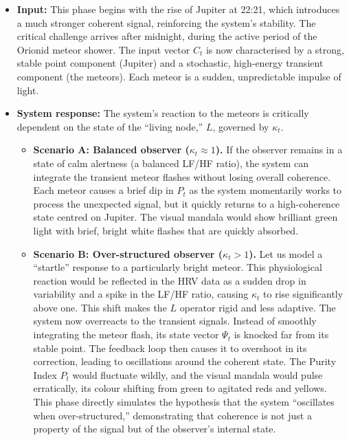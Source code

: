 \documentclass{article}
\begin{document}
\begin{itemize}
    \item \textbf{Input:} This phase begins with the rise of Jupiter at 22:21, which introduces a much stronger coherent signal, reinforcing the system's stability. The critical challenge arrives after midnight, during the active period of the Orionid meteor shower. The input vector $C_t$ is now characterised by a strong, stable point component (Jupiter) and a stochastic, high-energy transient component (the meteors). Each meteor is a sudden, unpredictable impulse of light.
    \item \textbf{System response:} The system's reaction to the meteors is critically dependent on the state of the ``living node,'' $L$, governed by $\kappa_t$.
    \begin{itemize}
        \item \textbf{Scenario A: Balanced observer ($\kappa_t \approx 1$).} If the observer remains in a state of calm alertness (a balanced LF/HF ratio), the system can integrate the transient meteor flashes without losing overall coherence. Each meteor causes a brief dip in $P_t$ as the system momentarily works to process the unexpected signal, but it quickly returns to a high-coherence state centred on Jupiter. The visual mandala would show brilliant green light with brief, bright white flashes that are quickly absorbed.
        \item \textbf{Scenario B: Over-structured observer ($\kappa_t > 1$).} Let us model a ``startle'' response to a particularly bright meteor. This physiological reaction would be reflected in the HRV data as a sudden drop in variability and a spike in the LF/HF ratio, causing $\kappa_t$ to rise significantly above one. This shift makes the $L$ operator rigid and less adaptive. The system now overreacts to the transient signals. Instead of smoothly integrating the meteor flash, its state vector $\Psi_t$ is knocked far from its stable point. The feedback loop then causes it to overshoot in its correction, leading to oscillations around the coherent state. The Purity Index $P_t$ would fluctuate wildly, and the visual mandala would pulse erratically, its colour shifting from green to agitated reds and yellows. This phase directly simulates the hypothesis that the system ``oscillates when over-structured,'' demonstrating that coherence is not just a property of the signal but of the observer's internal state.
    \end{itemize}
\end{itemize}
\end{document}
